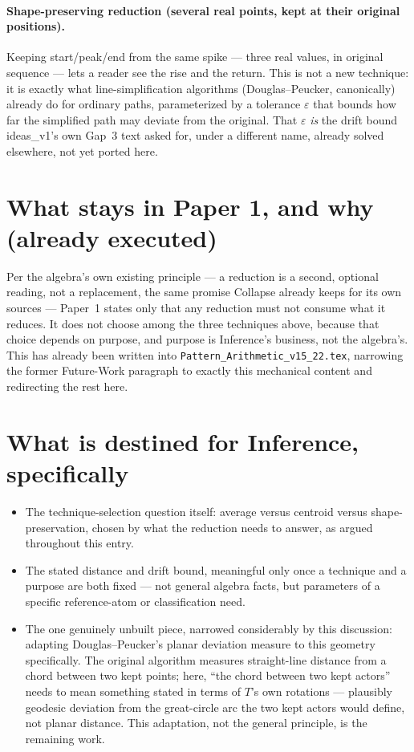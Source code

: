 \documentclass[11pt]{article}
\begin{document}
\paragraph{Shape-preserving reduction (several real points, kept at
their original positions).} Keeping start/peak/end from the same
spike --- three real values, in original sequence --- lets a reader
see the rise and the return. This is not a new technique: it is
exactly what line-simplification algorithms (Douglas--Peucker,
canonically) already do for ordinary paths, parameterized by a
tolerance $\varepsilon$ that bounds how far the simplified path may
deviate from the original. That $\varepsilon$ \emph{is} the drift
bound ideas\_v1's own Gap~3 text asked for, under a different name,
already solved elsewhere, not yet ported here.

\section{What stays in Paper 1, and why (already executed)}

Per the algebra's own existing principle --- a reduction is a
second, optional reading, not a replacement, the same promise
Collapse already keeps for its own sources --- Paper~1 states only
that any reduction must not consume what it reduces. It does not
choose among the three techniques above, because that choice depends
on purpose, and purpose is Inference's business, not the algebra's.
This has already been written into
\texttt{Pattern\_Arithmetic\_v15\_22.tex}, narrowing the former
Future-Work paragraph to exactly this mechanical content and
redirecting the rest here.

\section{What is destined for Inference, specifically}

\begin{itemize}
\item The technique-selection question itself: average versus
centroid versus shape-preservation, chosen by what the reduction
needs to answer, as argued throughout this entry.
\item The stated distance and drift bound, meaningful only once a
technique and a purpose are both fixed --- not general algebra
facts, but parameters of a specific reference-atom or classification
need.
\item The one genuinely unbuilt piece, narrowed considerably by this
discussion: adapting Douglas--Peucker's planar deviation measure to
this geometry specifically. The original algorithm measures
straight-line distance from a chord between two kept points; here,
``the chord between two kept actors'' needs to mean something
stated in terms of $T$'s own rotations --- plausibly geodesic
deviation from the great-circle arc the two kept actors would
define, not planar distance. This adaptation, not the general
principle, is the remaining work.
\end{itemize}
\end{document}
